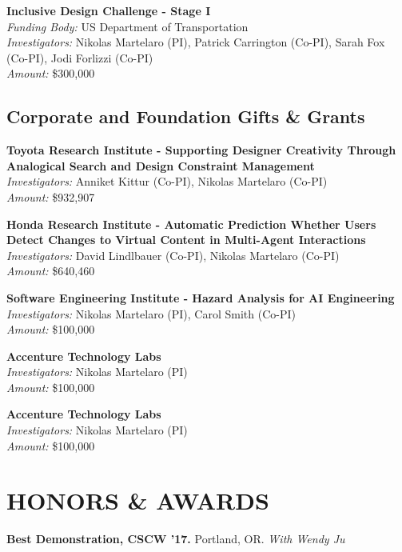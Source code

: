 \documentclass[11pt]{article} %
\begin{document}
 \textbf{Inclusive Design Challenge - Stage I}\\
\textit{Funding Body:} US Department of Transportation\\
\textit{Investigators:} Nikolas Martelaro (PI), Patrick Carrington (Co-PI), Sarah Fox (Co-PI), Jodi Forlizzi (Co-PI)\\
\textit{Amount:} \$300,000

\subsection*{Corporate and Foundation Gifts \& Grants}

 \textbf{Toyota Research Institute - Supporting Designer Creativity Through Analogical Search and Design Constraint Management}\\
\textit{Investigators:} Anniket Kittur (Co-PI), Nikolas Martelaro (Co-PI)\\
\textit{Amount:} \$932,907
\medskip

 \textbf{Honda Research Institute - Automatic Prediction Whether Users Detect Changes to Virtual Content in Multi-Agent Interactions}\\
\textit{Investigators:} David Lindlbauer (Co-PI), Nikolas Martelaro (Co-PI)\\
\textit{Amount:} \$640,460
\medskip

 \textbf{Software Engineering Institute - Hazard Analysis for AI Engineering}\\
\textit{Investigators:} Nikolas Martelaro (PI), Carol Smith (Co-PI)\\
\textit{Amount:} \$100,000
\medskip

 \textbf{Accenture Technology Labs}\\
\textit{Investigators:} Nikolas Martelaro (PI)\\
\textit{Amount:} \$100,000
\medskip

 \textbf{Accenture Technology Labs}\\
\textit{Investigators:} Nikolas Martelaro (PI)\\
\textit{Amount:} \$100,000


\section*{HONORS \& AWARDS}
\textbf{Best Demonstration, CSCW ’17.} Portland, OR. \textit{With Wendy Ju}
\medskip
\end{document}
